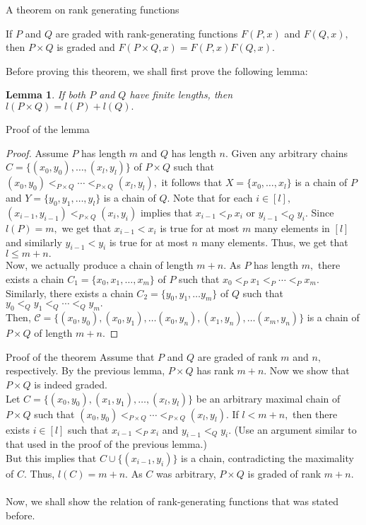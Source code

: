\documentclass[handout, aspectratio=169]{beamer}
\newtheorem{lem}{Lemma}
\begin{document}
\begin{frame}{A theorem on rank generating functions}
	\begin{theorem}
		If $P$ and $Q$ are graded with rank-generating functions $F(P, x)$ and $F(Q, x),$ then $P \times Q$ is graded and $F(P\times Q, x) = F(P, x)F(Q, x).$
	\end{theorem}
	Before proving this theorem, we shall first prove the following lemma:
	\begin{lem}
		If both $P$ and $Q$ have finite lengths, then $l(P\times Q) = l(P) + l(Q).$
	\end{lem}
\end{frame}
\begin{frame}{Proof of the lemma}
	
	\begin{proof}
		Assume $P$ has length $m$ and $Q$ has length $n.$ Given any arbitrary chains $C = \{(x_0, y_0), \ldots, (x_l, y_l)\}$ of $P \times Q$ such that $(x_0, y_0) <_{P \times Q} \cdots <_{P \times Q} (x_l, y_l),$ it follows that $X = \{x_0, \ldots, x_l\}$ is a chain of $P$ and $Y = \{y_0, y_1, \ldots, y_l\}$ is a chain of $Q.$ Note that for each $i \in [l],$ $(x_{i-1}, y_{i-1}) <_{P \times Q} (x_i, y_i)$ implies that $x_{i-1} <_P x_i$ or $y_{i - 1} <_Q y_i.$ Since $l(P) = m,$ we get that $x_{i-1} < x_i$ is true for at most $m$ many elements in $[l]$ and similarly $y_{i-1} < y_i$ is true for at most $n$ many elements. Thus, we get that $l \le m + n.$\\
		Now, we actually produce a chain of length $m + n.$ As $P$ has length $m,$ there exists a chain $C_1 = \{x_0, x_1,\ldots, x_m\}$ of $P$ such that $x_0 <_P x_1 <_P \cdots <_P x_m.$ Similarly, there exists a chain $C_2 = \{y_0, y_1, \ldots y_m\}$ of $Q$ such that $y_0 <_Q y_1 <_Q \cdots <_Q y_m.$ \\
		Then, $\mathcal{C} = \{(x_0, y_0), (x_0, y_1), \ldots (x_0, y_n), (x_1, y_n), \ldots (x_m, y_n)\}$ is a chain of $P\times Q$ of length $m + n.$
	\end{proof}
\end{frame}
\begin{frame}{Proof of the theorem}
	Assume that $P$ and $Q$ are graded of rank $m$ and $n,$ respectively. By the previous lemma, $P \times Q$ has rank $m + n.$ Now we show that $P \times Q$ is indeed graded.\\
	Let $C = \{(x_0, y_0), (x_1, y_1), \ldots, (x_l, y_l)\}$ be an arbitrary maximal chain of $P \times Q$ such that $(x_0, y_0) <_{P \times Q} \cdots <_{P \times Q} (x_l, y_l).$ If $l < m + n,$ then there exists $i \in [l]$ such that $x_{i-1} <_P x_i$ and $y_{i-1} <_Q y_i.$ (Use an argument similar to that used in the proof of the previous lemma.)\\
	But this implies that $C \cup \{(x_{i-1}, y_i)\}$ is a chain, contradicting the maximality of $C.$ Thus, $l(C) = m + n.$ As $C$ was arbitrary, $P\times Q$ is graded of rank $m + n.$\\~\\
	Now, we shall show the relation of rank-generating functions that was stated before.
\end{frame}
\end{document}
